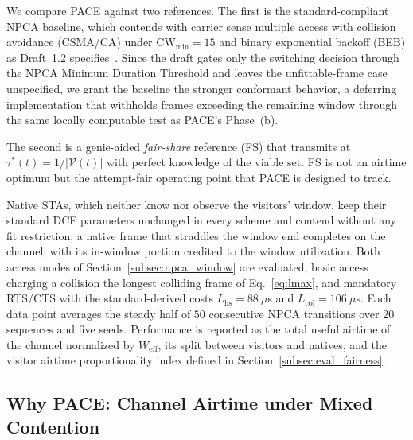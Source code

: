 \documentclass[conference]{IEEEtran}
\newcommand{\Nvis}{N_\mathrm{vis}}
\begin{document}
We compare PACE against two references. The first is the standard-compliant NPCA baseline, which contends with carrier sense multiple access with collision avoidance (CSMA/CA) under $\mathrm{CW}_{\min}=15$ and binary exponential backoff (BEB) as Draft~1.2 specifies~\cite{ieee80211bn}. Since the draft gates only the switching decision through the NPCA Minimum Duration Threshold and leaves the unfittable-frame case unspecified, we grant the baseline the stronger conformant behavior, a deferring implementation that withholds frames exceeding the remaining window through the same locally computable test as PACE's Phase~(b).

The second is a genie-aided \emph{fair-share} reference (FS) that transmits at $\tau^*(t)=1/|\mathcal{V}(t)|$ with perfect knowledge of the viable set. FS is not an airtime optimum but the attempt-fair operating point that PACE is designed to track.

Native STAs, which neither know nor observe the visitors' window, keep their standard DCF parameters unchanged in every scheme and contend without any fit restriction; a native frame that straddles the window end completes on the channel, with its in-window portion credited to the window utilization. Both access modes of Section~\ref{subsec:npca_window} are evaluated, basic access charging a collision the longest colliding frame of Eq.~\eqref{eq:lmax}, and mandatory RTS/CTS with the standard-derived costs $L_\mathrm{hs}=88~\mu$s and $L_\mathrm{col}=106~\mu$s. Each data point averages the steady half of $50$ consecutive NPCA transitions over $20$ sequences and five seeds. Performance is reported as the total useful airtime of the channel normalized by $W_\mathrm{eff}$, its split between visitors and natives, and the visitor airtime proportionality index defined in Section~\ref{subsec:eval_fairness}.

\subsection{Why PACE: Channel Airtime under Mixed Contention}
\label{subsec:eval_whypace}
\end{document}
